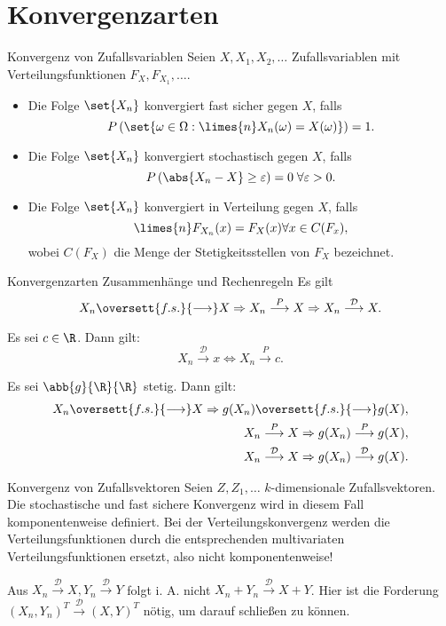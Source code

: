 \appendix
\section{Konvergenzarten}

\begin{karte}{Konvergenz von Zufallsvariablen}
Seien \(X, X_1, X_2, \ldots\) Zufallsvariablen mit Verteilungsfunktionen 
\(F_X, F_{X_1}, \ldots\).
\begin{itemize}
    \item Die Folge \(\set{X_n}\) konvergiert fast sicher gegen \(X\), falls 
    \[ P\left( \set{ \omega \in \Omega : \limes{n} X_n(\omega) = X(\omega) }\right) = 1. \]
    \item Die Folge \(\set{X_n}\) konvergiert stochastisch gegen \(X\), falls 
    \[ P\left( \abs{X_n - X} \geq \varepsilon \right) = 0 \;\forall \varepsilon > 0. \]
    \item Die Folge \(\set{X_n}\) konvergiert in Verteilung gegen \(X\), falls 
    \[ \limes{n} F_{X_n}(x) = F_X(x) \forall x\in C(F_x), \]
    wobei \(C(F_X)\) die Menge der Stetigkeitsstellen von \(F_X\) bezeichnet.
\end{itemize}
\end{karte}

\begin{karte}{Konvergenzarten Zusammenhänge und Rechenregeln}
Es gilt 
\[ X_n \oversett{f.s.}{\longrightarrow} X \Rightarrow X_n \overset{P}{\longrightarrow} X \Rightarrow X_n \overset{\mathcal{D}}{\longrightarrow} X. \]

Es sei \(c\in\R\). Dann gilt: 
\[ X_n \overset{\mathcal{D}}{\longrightarrow} x \Leftrightarrow X_n \overset{P}{\longrightarrow} c. \]

Es sei \(\abb{g}{\R}{\R}\) stetig. Dann gilt: 
\begin{align*}
    X_n \oversett{f.s.}{\longrightarrow} X \Rightarrow g(X_n) \oversett{f.s.}{\longrightarrow} g(X), \\
    X_n \overset{P}{\longrightarrow} X \Rightarrow g(X_n) \overset{P}{\longrightarrow} g(X), \\
    X_n \overset{\mathcal{D}}{\longrightarrow} X \Rightarrow g(X_n) \overset{\mathcal{D}}{\longrightarrow} g(X).
\end{align*}
\end{karte}

\begin{karte}{Konvergenz von Zufallsvektoren}
Seien \(Z, Z_1, \ldots\) \(k\)-dimensionale Zufallsvektoren. Die stochastische 
und fast sichere Konvergenz wird in diesem Fall komponentenweise definiert. 
Bei der Verteilungskonvergenz werden die Verteilungsfunktionen durch die entsprechenden 
multivariaten Verteilungsfunktionen ersetzt, also nicht komponentenweise!

Aus \(X_n \overset{\mathcal{D}}{\longrightarrow} X, Y_n \overset{\mathcal{D}}{\longrightarrow} Y\) folgt i. A. nicht 
\(X_n + Y_n \overset{\mathcal{D}}{\longrightarrow} X + Y \). Hier ist die Forderung \((X_n, Y_n)^T \overset{\mathcal{D}}{\longrightarrow} (X,Y)^T\)
nötig, um darauf schließen zu können.
\end{karte}

